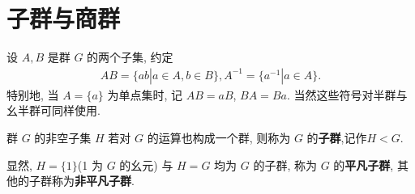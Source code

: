 \documentclass[../../main.tex]{subfiles}
\begin{document}
\section{子群与商群}

\begin{definition}
设 \( A, B \) 是群 \( G \) 的两个子集, 约定
\begin{align*}
AB = \{ab|a \in A, b \in B\} , A^{-1} = \{a^{-1}|a \in A\}.
\end{align*}
特别地, 当 \( A = \{a\} \) 为单点集时, 记 \( AB = aB \), \( BA = Ba \). 当然这些符号对半群与幺半群可同样使用.
\end{definition}

\begin{definition}
群 \( G \) 的非空子集 \( H \) 若对 \( G \) 的运算也构成一个群, 则称为 \( G \) 的\textbf{子群},记作$H<G$.
\end{definition}
\begin{remark}
显然, \( H = \{1\} \)(1 为 \( G \) 的幺元) 与 \( H = G \) 均为 \( G \) 的子群, 称为 \( G \) 的\textbf{平凡子群}, 其他的子群称为\textbf{非平凡子群}.
\end{remark}
\end{document}
